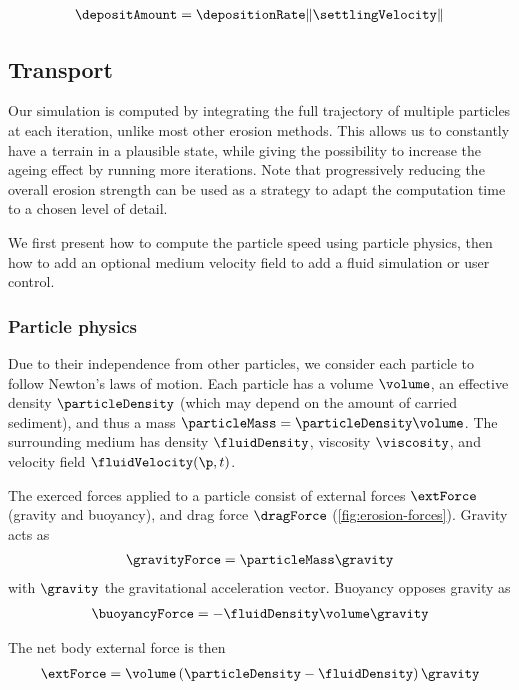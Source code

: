 \begin{align}
    \label{eq:erosion-deltaDepositon}
    \depositAmount = \depositionRate \|\settlingVelocity\|
\end{align}

\subsection{Transport}
Our simulation is computed by integrating the full trajectory of multiple particles at each iteration, unlike most other erosion methods. This allows us to constantly have a terrain in a plausible state, while giving the possibility to increase the ageing effect by running more iterations. 
Note that progressively reducing the overall erosion strength can be used as a strategy to adapt the computation time to a chosen level of detail.

We first present how to compute the particle speed using particle physics, then how to add an optional medium velocity field to add a fluid simulation or user control.


\subsubsection{Particle physics}
Due to their independence from other particles, we consider each particle to follow Newton's laws of motion. Each particle has a volume $\volume$, an effective density $\particleDensity$ (which may depend on the amount of carried sediment), and thus a mass $\particleMass = \particleDensity \volume$. The surrounding medium has density $\fluidDensity$, viscosity $\viscosity$, and velocity field $\fluidVelocity(\p,t)$.

The exerced forces applied to a particle consist of external forces $\extForce$ (gravity and buoyancy), and drag force $\dragForce$ (\cref{fig:erosion-forces}). Gravity acts as
\begin{align}
    \gravityForce = \particleMass \gravity
\end{align}
with $\gravity$ the gravitational acceleration vector. Buoyancy opposes gravity as
\begin{align}
    \buoyancyForce = -\fluidDensity \volume \gravity
\end{align}

The net body external force is then
\begin{align}
\label{eq:erosion-bodyforce}
    \extForce = \volume \left(\particleDensity - \fluidDensity\right)\gravity
\end{align}

